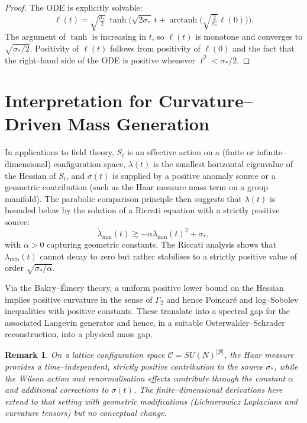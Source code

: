 \documentclass[11pt]{article}
\newtheorem{remark}[theorem]{Remark}
\begin{document}
\begin{proof}
The ODE is explicitly solvable:
\[
  \ell(t)
  = \sqrt{\tfrac{\sigma_*}{2}}\,
    \tanh\Big(\sqrt{2\sigma_*}\,t
      + \operatorname{arctanh}\big(\sqrt{\tfrac{2}{\sigma_*}}\ell(0)\big)
      \Big).
\]
The argument of $\tanh$ is increasing in $t$, so $\ell(t)$ is
monotone and converges to $\sqrt{\sigma_*/2}$.  Positivity of $\ell(t)$
follows from positivity of $\ell(0)$ and the fact that the right--hand
side of the ODE is positive whenever $\ell^2<\sigma_*/2$.
\end{proof}

\section{Interpretation for Curvature--Driven Mass Generation}

In applications to field theory, $S_t$ is an effective action on a
(finite or infinite--dimensional) configuration space, $\lambda(t)$ is
the smallest horizontal eigenvalue of the Hessian of $S_t$, and
$\sigma(t)$ is supplied by a positive anomaly source or a geometric
contribution (such as the Haar measure mass term on a group manifold).
The parabolic comparison principle then suggests that $\lambda(t)$ is
bounded below by the solution of a Riccati equation with a strictly
positive source:
\[
  \dot\lambda_{\min}(t) \gtrsim -\alpha\lambda_{\min}(t)^2 + \sigma_*,
\]
with $\alpha>0$ capturing geometric constants.  The Riccati analysis
shows that $\lambda_{\min}(t)$ cannot decay to zero but rather
stabilises to a strictly positive value of order $\sqrt{\sigma_*/\alpha}$.

Via the Bakry--\'Emery theory, a uniform positive lower bound on the
Hessian implies positive curvature in the sense of $\Gamma_2$ and hence
Poincar\'e and log--Sobolev inequalities with positive constants.  These
translate into a spectral gap for the associated Langevin generator and
hence, in a suitable Osterwalder--Schrader reconstruction, into a
physical mass gap.

\begin{remark}
On a lattice configuration space $\mathcal{C} = SU(N)^{|\mathcal{B}|}$,
the Haar measure provides a time--independent, strictly positive
contribution to the source $\sigma_*$, while the Wilson action and
renormalisation effects contribute through the constant $\alpha$ and
additional corrections to $\sigma(t)$.  The finite--dimensional
derivations here extend to that setting with geometric modifications
(Lichnerowicz Laplacians and curvature tensors) but no conceptual
change.
\end{remark}
\end{document}
